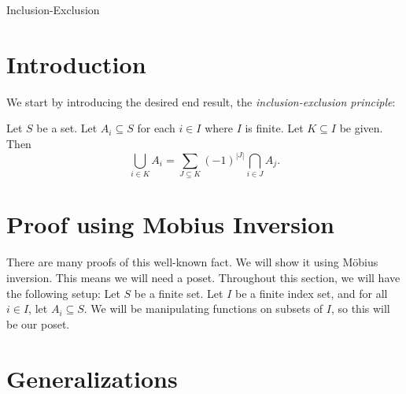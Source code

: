 \documentclass[12pt]{pom_thesis}
\begin{document}
\begin{chapter}{Inclusion-Exclusion}
\section{Introduction}
We start by introducing the desired end result, the \emph{inclusion-exclusion principle}:
\begin{thm}\label{iep}
Let $S$ be a set. Let $A_i \subseteq S$ for each $i \in I$ where $I$ is finite. Let $K \subseteq I$ be given. Then
\[
\bigcup_{i \in K}A_i = \sum_{J \subseteq K}(-1)^{|J|}\bigcap_{i \in J}A_j
.\]
\end{thm}
\section{Proof using Mobius Inversion}
There are many proofs of this well-known fact. We will show it using M\"obius inversion. This means we will need a poset. Throughout this section, we will have the following setup: Let $S$ be a finite set. Let $I$ be a finite index set, and for all $i \in I$, let $A_i \subseteq S$. We will be manipulating functions on subsets of $I$, so this will be our poset.
\section{Generalizations}

\end{chapter}
\end{document}
